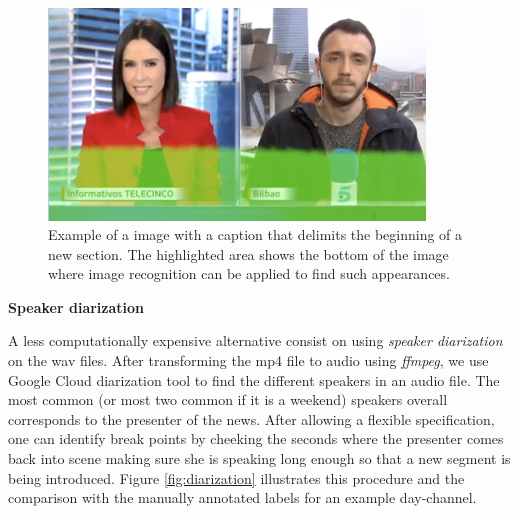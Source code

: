 \documentclass[12pt]{article}
\begin{document}
\begin{figure}[H]	\label{fig:image_rec}
	\centering
	\includegraphics[width=100mm]{figures/image_recog}
	\caption{Example of a image with a caption that delimits the beginning of a new section. The highlighted area shows the bottom of the image where image recognition can be applied to find such appearances.}

\end{figure} 




\textbf{Speaker diarization}


A less computationally expensive alternative consist on using \textit{speaker diarization} on the wav files. After transforming the mp4 file to audio using \textit{ffmpeg}, we use Google Cloud diarization tool to find the different speakers in an audio file. The most common (or most two common if it is a weekend) speakers overall corresponds to the presenter of the news. After allowing a flexible specification, one can identify break points by cheeking the seconds where the presenter comes back into scene making sure she is speaking long enough so that a new segment is being introduced. Figure \ref{fig:diarization} illustrates this procedure and the comparison with the manually annotated labels for an example day-channel.
\end{document}

